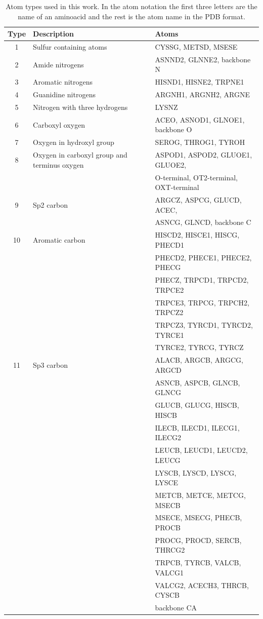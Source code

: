 \begin{table}[H]
\begin{center}
\begin{tabular}{ c | l | l }
    
    Type & Description & Atoms \\
    \hline
    1 & Sulfur containing atoms & CYSSG, METSD, MSESE \\ \hline
    2 & Amide nitrogens & ASNND2, GLNNE2, backbone N \\ \hline
    3 & Aromatic nitrogens & HISND1, HISNE2, TRPNE1 \\ \hline
    4 & Guanidine nitrogens & ARGNH1, ARGNH2, ARGNE \\ \hline
    5 & Nitrogen with three hydrogens & LYSNZ \\ \hline
    6 & Carboxyl oxygen & ACEO, ASNOD1, GLNOE1, backbone O \\ \hline
    7 & Oxygen in hydroxyl group & SEROG, THROG1, TYROH \\ \hline
    8 & Oxygen in carboxyl group and terminus oxygen & ASPOD1, ASPOD2, GLUOE1, GLUOE2, \\
     & &  O-terminal, OT2-terminal, OXT-terminal \\ \hline
    9 & Sp2 carbon & ARGCZ, ASPCG, GLUCD, ACEC, \\
     & & ASNCG, GLNCD, backbone C \\ \hline
    10 & Aromatic carbon & HISCD2, HISCE1, HISCG, PHECD1 \\
     & & PHECD2, PHECE1, PHECE2, PHECG \\ 
     & & PHECZ, TRPCD1, TRPCD2, TRPCE2 \\
     & & TRPCE3, TRPCG, TRPCH2, TRPCZ2 \\
     & & TRPCZ3, TYRCD1, TYRCD2, TYRCE1 \\
     & & TYRCE2, TYRCG, TYRCZ \\ \hline
    11 & Sp3 carbon & ALACB, ARGCB, ARGCG, ARGCD \\
     & & ASNCB, ASPCB, GLNCB, GLNCG \\
     & & GLUCB, GLUCG, HISCB, HISCB \\
     & & ILECB, ILECD1, ILECG1, ILECG2 \\
     & & LEUCB, LEUCD1, LEUCD2, LEUCG \\
     & & LYSCB, LYSCD, LYSCG, LYSCE \\
     & & METCB, METCE, METCG, MSECB \\
     & & MSECE, MSECG, PHECB, PROCB \\
     & & PROCG, PROCD, SERCB, THRCG2 \\
     & & TRPCB, TYRCB, VALCB, VALCG1 \\
     & & VALCG2, ACECH3, THRCB, CYSCB \\
     & & backbone CA \\ \hline
    
\end{tabular}
    
    \caption {Atom types used in this work. In the atom notation the first three letters are the name of an aminoacid and the rest is 
    the atom name in the PDB format.}
    \label{Tbl:atomTypes}
\end{center}
\end{table}
